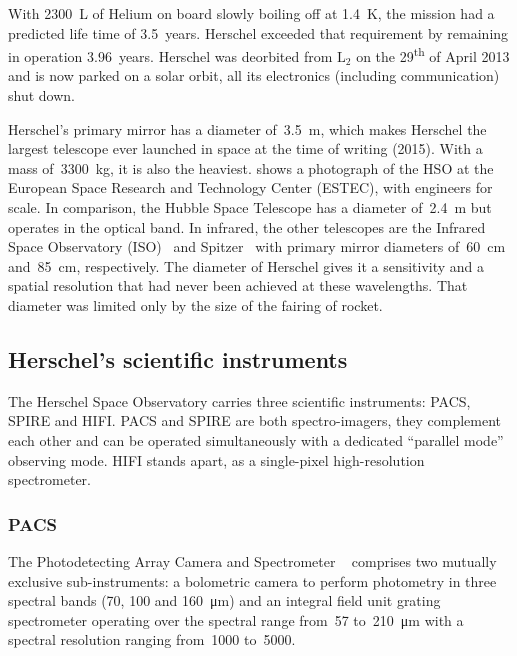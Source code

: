 With \SI{2300}{\liter} of Helium on board slowly boiling off at \SI{1.4}{\kelvin}, the mission had a predicted life time of 3.5~years.
Herschel exceeded that requirement by remaining in operation 3.96~years.
Herschel was deorbited from $\text{L}_2$ on the 29\textsuperscript{th} of April 2013 and is now parked on a solar orbit, all its electronics (including communication) shut down.



Herschel's primary mirror has a diameter of~\SI{3.5}{\meter}, which makes Herschel the largest telescope ever launched in space at the time of writing (2015).
With a mass of~\SI{3300}{\kilo\gram}, it is also the heaviest.
 shows a photograph of the HSO at the European Space Research and Technology Center (ESTEC), with engineers for scale.
In comparison, the Hubble Space Telescope has a diameter of~\SI{2.4}{\meter} but operates in the optical band.
In infrared, the other telescopes
are
the Infrared Space Observatory (ISO)~\autocite{isoHandbook1}
and
Spitzer~\autocite{werner2004spitzer}
with primary mirror diameters of~\SI{60}{\centi\meter} and~\SI{85}{\centi\meter}, respectively.
The diameter of Herschel gives it a sensitivity and a spatial resolution that had never been achieved at these wavelengths.
That diameter was limited only by the size of the fairing of rocket.


\subsection{Herschel's scientific instruments}

The Herschel Space Observatory carries three scientific instruments: PACS, SPIRE and HIFI.
PACS and SPIRE are both  spectro-imagers, they complement each other and can be operated simultaneously with a dedicated ``parallel mode'' observing mode.
HIFI stands apart, as a single-pixel high-resolution spectrometer.

\subsubsection{PACS}
The Photodetecting Array Camera and Spectrometer%
~\autocite{poglitsch2010photodetector}
comprises two mutually exclusive sub-instruments: a bolometric camera to perform photometry in three spectral bands (\num{70}, \num{100} and \SI{160}{\micro\meter}) and an integral field unit grating spectrometer operating over the spectral range from~\num{57} to~\SI{210}{\micro\meter} with a spectral resolution ranging from~\num{1000} to~\num{5000}.

